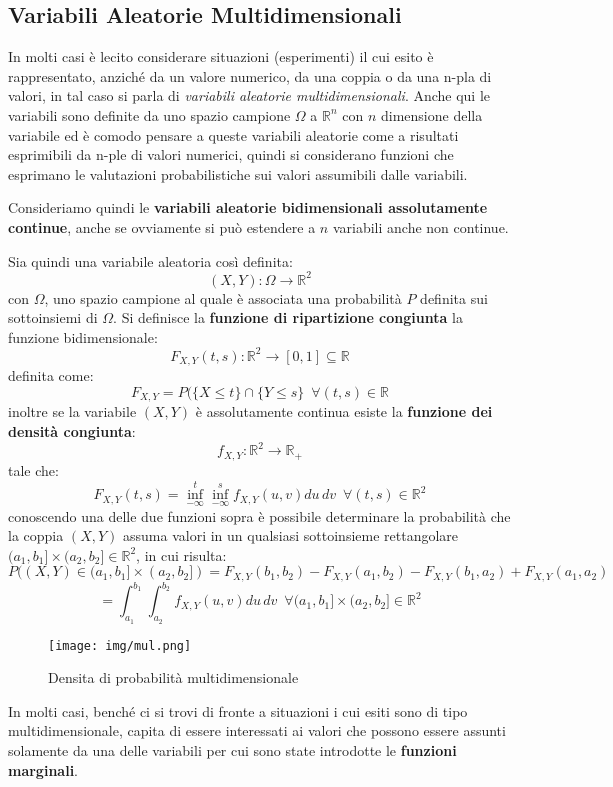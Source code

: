 \documentclass[a4paper,12pt, oneside]{book}
\newcommand{\numberset}{\mathbb}
\newcommand{\R}{\numberset{R}}
\begin{document}
\subsection{Variabili Aleatorie Multidimensionali}
In molti casi è lecito considerare situazioni (esperimenti) il cui esito è rappresentato, 
anziché da un valore numerico, da una coppia o da una n-pla di valori, in tal caso 
si parla di \textit{variabili aleatorie multidimensionali}.\newline
Anche qui le variabili sono definite da uno spazio campione $\Omega$ a $\mathbb{R}^n$ con $n$ dimensione della variabile
ed è comodo pensare a queste variabili aleatorie come a risultati esprimibili da n-ple di valori numerici,
quindi si considerano funzioni che esprimano le valutazioni probabilistiche sui valori assumibili dalle variabili.

Consideriamo quindi le \textbf{variabili aleatorie bidimensionali assolutamente continue}, 
anche se ovviamente si può estendere a $n$ variabili anche non continue.

Sia quindi una variabile aleatoria così definita:
\[(X, Y):\Omega \to \R ^2\]
con $\Omega$, uno spazio campione al quale è associata una probabilità $P$ definita sui sottoinsiemi di $\Omega$.\newline
Si definisce la \textbf{funzione di ripartizione congiunta} la funzione bidimensionale:
\[F_{X, Y}(t, s):\R ^2 \to [0,1] \subseteq \R\]
definita come:
\[F_{X, Y} = P(\{X \leq t\} \cap \{Y \leq s\}\,\,\,\forall (t,s)\in \R\]
inoltre se la variabile $(X,Y)$ è assolutamente continua esiste la \textbf{funzione dei densità congiunta}:
\[f_{X, Y}:\R ^2 \to \R_+\]
tale che:
\[F_{X, Y}(t, s) = \inf_{-\infty}^t \inf_{-\infty}^s f_{X, Y}(u, v)du\,dv\,\,\,\forall (t, s)\in \R ^2\]
conoscendo una delle due funzioni sopra è possibile determinare la probabilità che la coppia $(X,Y)$ assuma
valori in un qualsiasi sottoinsieme rettangolare $(a_1, b_1] \times (a_2, b_2] \in \R^2$, in cui risulta:
\[P((X, Y) \in (a_1, b_1] \times (a_2, b_2]) = F_{X, Y} (b_1, b_2) - F_{X, Y}(a_1, b_2) 
                                             - F_{X, Y} (b_1, a_2) + F_{X, Y}(a_1, a_2)\]
\[= \int_{a_1}^{b_1} \int_{a_2}^{b_2} f_{X, Y}(u, v) du\,dv\,\,\, \forall (a_1, b_1] \times(a_2, b_2] \in \R^2\]

\begin{figure}
    \caption{Densita di probabilità multidimensionale}
    \label{img:densitaMulti}
    \texttt{[image: img/mul.png]}
\end{figure}
In molti casi, benché ci si trovi di fronte a situazioni i cui esiti sono di tipo multidimensionale, 
capita di essere interessati ai valori che possono essere assunti solamente da una delle variabili per cui 
sono state introdotte le \textbf{funzioni marginali}.
\end{document}
